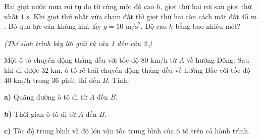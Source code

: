 \begin{ex}
	Hai giọt nước mưa rơi tự do từ cùng một độ cao $h$, giọt thứ hai rơi sau giọt thứ nhất $1\text{ s}$. Khi giọt thứ nhất vừa chạm đất thì giọt thứ hai còn cách mặt đất $45\text{ m}$. Bỏ qua lực cản không khí, lấy $g = 10\text{ m/s}^2$. Độ cao $h$ bằng bao nhiêu mét?

	\par{}
\end{ex}

\vspace{0.15cm}
\begin{flushleft}
	{\color{blue!50!green}}
	\textit{\small (Thí sinh trình bày lời giải từ câu 1 đến câu 3.)}
\end{flushleft}
\setcounter{ex}{0}
\setcounter{bt}{0}

\begin{ex}
	Một ô tô chuyển động thẳng đều với tốc độ $80\text{ km/h}$ từ $A$ về hướng Đông. Sau khi đi được $32\text{ km}$, ô tô rẽ trái chuyển động thẳng đều về hướng Bắc với tốc độ $40\text{ km/h}$ trong $36\text{ phút}$ thì đến $B$. Tính:
	\par \textbf{a)} Quãng đường ô tô đi từ $A$ đến $B$. \par \textbf{b)} Thời gian ô tô đi từ $A$ đến $B$. \par \textbf{c)} Tốc độ trung bình và độ lớn vận tốc trung bình của ô tô trên cả hành trình.
\end{ex}

